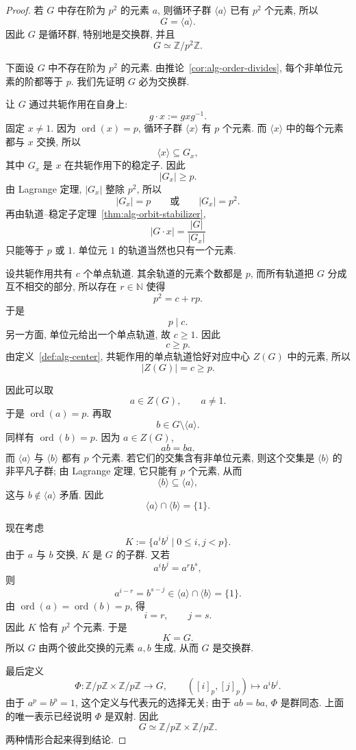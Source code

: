 \documentclass[usesamecnt, thmcnt=section, lang=cn, newtx, 10pt, scheme=chinese]{elegantbook}
\begin{document}
\begin{proof}
若 $G$ 中存在阶为 $p^2$ 的元素 $a$, 则循环子群 $\langle a\rangle$ 已有 $p^2$ 个元素, 所以
\[
 G=\langle a\rangle.
\]
因此 $G$ 是循环群, 特别地是交换群, 并且
\[
 G\simeq\mathbb Z/p^2\mathbb Z.
\]

下面设 $G$ 中不存在阶为 $p^2$ 的元素. 由推论~\ref{cor:alg-order-divides}, 每个非单位元素的阶都等于 $p$. 我们先证明 $G$ 必为交换群.

让 $G$ 通过共轭作用在自身上:
\[
 g\cdot x:=gxg^{-1}.
\]
固定 $x\neq1$. 因为 $\operatorname{ord}(x)=p$, 循环子群 $\langle x\rangle$ 有 $p$ 个元素. 而 $\langle x\rangle$ 中的每个元素都与 $x$ 交换, 所以
\[
 \langle x\rangle\subseteq G_x,
\]
其中 $G_x$ 是 $x$ 在共轭作用下的稳定子. 因此
\[
 |G_x|\geq p.
\]
由 Lagrange 定理, $|G_x|$ 整除 $p^2$, 所以
\[
 |G_x|=p
 \qquad\text{或}\qquad
 |G_x|=p^2.
\]
再由轨道--稳定子定理~\ref{thm:alg-orbit-stabilizer},
\[
 |G\cdot x|
 =\frac{|G|}{|G_x|}
\]
只能等于 $p$ 或 $1$. 单位元 $1$ 的轨道当然也只有一个元素.

设共轭作用共有 $c$ 个单点轨道. 其余轨道的元素个数都是 $p$, 而所有轨道把 $G$ 分成互不相交的部分, 所以存在 $r\in\mathbb N$ 使得
\[
 p^2=c+rp.
\]
于是
\[
 p\mid c.
\]
另一方面, 单位元给出一个单点轨道, 故 $c\geq1$. 因此
\[
 c\geq p.
\]
由定义~\ref{def:alg-center}, 共轭作用的单点轨道恰好对应中心 $Z(G)$ 中的元素, 所以
\[
 |Z(G)|=c\geq p.
\]

因此可以取
\[
 a\in Z(G),\qquad a\neq1.
\]
于是 $\operatorname{ord}(a)=p$. 再取
\[
 b\in G\setminus\langle a\rangle.
\]
同样有 $\operatorname{ord}(b)=p$. 因为 $a\in Z(G)$,
\[
 ab=ba.
\]
而 $\langle a\rangle$ 与 $\langle b\rangle$ 都有 $p$ 个元素. 若它们的交集含有非单位元素, 则这个交集是 $\langle b\rangle$ 的非平凡子群; 由 Lagrange 定理, 它只能有 $p$ 个元素, 从而
\[
 \langle b\rangle\subseteq\langle a\rangle,
\]
这与 $b\notin\langle a\rangle$ 矛盾. 因此
\[
 \langle a\rangle\cap\langle b\rangle=\{1\}.
\]

现在考虑
\[
 K:=\{a^ib^j\mid 0\leq i,j<p\}.
\]
由于 $a$ 与 $b$ 交换, $K$ 是 $G$ 的子群. 又若
\[
 a^ib^j=a^rb^s,
\]
则
\[
 a^{i-r}=b^{s-j}
 \in\langle a\rangle\cap\langle b\rangle=\{1\}.
\]
由 $\operatorname{ord}(a)=\operatorname{ord}(b)=p$, 得
\[
 i=r,\qquad j=s.
\]
因此 $K$ 恰有 $p^2$ 个元素. 于是
\[
 K=G.
\]
所以 $G$ 由两个彼此交换的元素 $a,b$ 生成, 从而 $G$ 是交换群.

最后定义
\[
 \Phi:
 \mathbb Z/p\mathbb Z\times\mathbb Z/p\mathbb Z
 \longrightarrow G,
 \qquad
 ([i]_p,[j]_p)\longmapsto a^ib^j.
\]
由于 $a^p=b^p=1$, 这个定义与代表元的选择无关; 由于 $ab=ba$, $\Phi$ 是群同态. 上面的唯一表示已经说明 $\Phi$ 是双射. 因此
\[
 G\simeq
 \mathbb Z/p\mathbb Z\times\mathbb Z/p\mathbb Z.
\]
两种情形合起来得到结论.
\end{proof}
\end{document}

